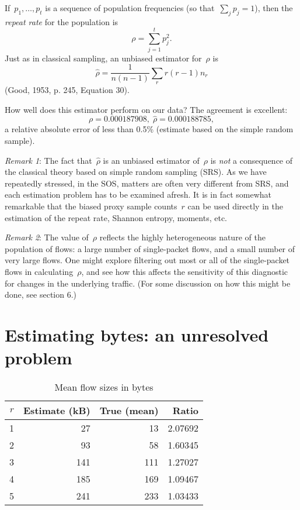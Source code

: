 \documentclass{paper}
\begin{document}
If~$p_1, \dots, p_t$ is a sequence of population frequencies (so that~$\sum_j
p_j = 1$), then the \emph{repeat rate} for the population is
$$ \rho = \sum_{j=1}^t p_j^2. $$
Just as in classical sampling, an unbiased estimator for~$\rho$ is
$$ \hat{\rho} = \frac{1}{n(n-1)} \sum_r r(r-1)n_r $$
(Good, 1953, p. 245, Equation 30).

How well does this estimator perform on our data? The agreement is excellent:
$$ \rho = 0.000187908,\; \hat{\rho}= 0.000188785, $$
a relative absolute error of less than 0.5\% (estimate based on the simple
random sample).

\emph{Remark 1}: The fact that~$\hat{\rho}$ is an unbiased estimator of~$\rho$
is \emph{not} a consequence of the classical theory based on simple random
sampling (SRS). As we have repeatedly stressed, in the SOS, matters are often
very different from SRS, and each estimation problem has to be examined afresh.
It is in fact somewhat remarkable that the biased proxy sample counts~$r$ can be
used directly in the estimation of the repeat rate, Shannon entropy, moments,
etc.

\emph{Remark 2}: The value of~$\rho$ reflects the highly heterogeneous nature of
the population of flows: a large number of single-packet flows, and a small
number of very large flows. One might explore filtering out most or all of the
single-packet flows in calculating~$\rho$, and see how this affects the
sensitivity of this diagnostic for changes in the underlying traffic. (For some
discussion on how this might be done, see section 6.)

\section{Estimating bytes: an unresolved problem}

\begin{table}
\begin{center}
\begin{tabular}{r r r r}
$r$ & Estimate (kB) & True (mean) & Ratio \\
\midrule
1 &  27 &  13 & 2.07692 \\
2 &  93 &  58 & 1.60345 \\
3 & 141 & 111 & 1.27027 \\
4 & 185 & 169 & 1.09467 \\
5 & 241 & 233 & 1.03433 \\
\end{tabular}
\caption{Mean flow sizes in bytes}
\label{flow_sizes}
\end{center}
\end{table}
\end{document}
